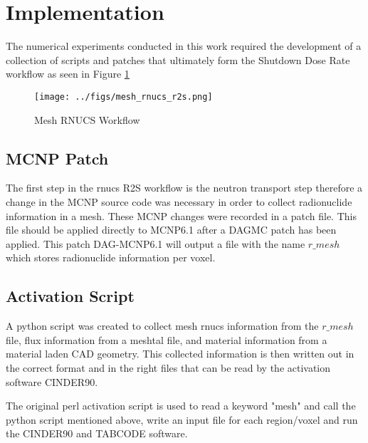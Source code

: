 \section{Implementation}
The numerical experiments conducted in this work required the 
development of a collection of scripts and patches that 
ultimately form the Shutdown Dose Rate workflow as seen in Figure 
\ref{mesh_rnucs}

\begin{figure}[ht]
\begin{centering}
\texttt{[image: ../figs/mesh\_rnucs\_r2s.png]}
\caption{Mesh RNUCS Workflow}
\label{mesh_rnucs}
\end{centering}
\end{figure}


\subsection{MCNP Patch}
The first step in the rnucs R2S workflow is the neutron transport step 
therefore a  change in the MCNP source code was necessary in order to 
collect radionuclide information in a mesh. 
These MCNP changes were recorded in a patch file. This file should be applied 
directly to MCNP6.1 after a DAGMC patch has been applied.
This patch DAG-MCNP6.1 will output a file with the name $r\_mesh$ which stores 
radionuclide information per voxel. 

\subsection{Activation Script}
A python script was created to collect mesh rnucs information from the $r\_mesh$
file, flux information from a meshtal file, and material information from a 
material laden CAD geometry. This collected information is then written out 
in the correct format and in the right files that can be read by the activation 
software CINDER90. 

The original perl activation script is used to read a keyword "mesh" and call the 
python script mentioned above, write an input file for each region/voxel and run 
the CINDER90 and TABCODE software. 



